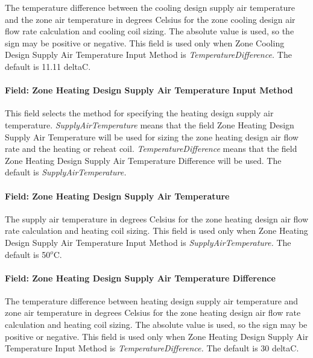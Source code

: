 The temperature difference between the cooling design supply air temperature and the zone air temperature in degrees Celsius for the zone cooling design air flow rate calculation and cooling coil sizing. The absolute value is used, so the sign may be positive or negative. This field is used only when Zone Cooling Design Supply Air Temperature Input Method is \emph{TemperatureDifference.} The default is 11.11 deltaC.

\paragraph{Field: Zone Heating Design Supply Air Temperature Input Method}\label{field-zone-heating-design-supply-air-temperature-input-method-7}

This field selects the method for specifying the heating design supply air temperature. \emph{SupplyAirTemperature} means that the field Zone Heating Design Supply Air Temperature will be used for sizing the zone heating design air flow rate and the heating or reheat coil. \emph{TemperatureDifference} means that the field Zone Heating Design Supply Air Temperature Difference will be used. The default is \emph{SupplyAirTemperature.}

\paragraph{Field: Zone Heating Design Supply Air Temperature}\label{field-zone-heating-design-supply-air-temperature-6}

The supply air temperature in degrees Celsius for the zone heating design air flow rate calculation and heating coil sizing. This field is used only when Zone Heating Design Supply Air Temperature Input Method is \emph{SupplyAirTemperature.} The default is 50\(^{o}\)C.

\paragraph{Field: Zone Heating Design Supply Air Temperature Difference}\label{field-zone-heating-design-supply-air-temperature-difference-7}

The temperature difference between heating design supply air temperature and zone air temperature in degrees Celsius for the zone heating design air flow rate calculation and heating coil sizing. The absolute value is used, so the sign may be positive or negative. This field is used only when Zone Heating Design Supply Air Temperature Input Method is \emph{TemperatureDifference.} The default is 30 deltaC.


